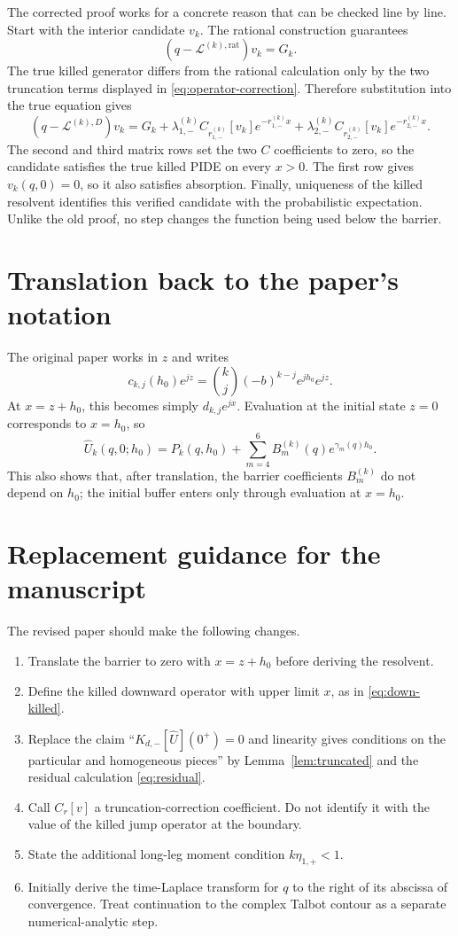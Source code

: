\documentclass[11pt]{article}
\newcommand{\cL}{\mathcal{L}}
\theoremstyle{plain}
\theoremstyle{remark}
\begin{document}
The corrected proof works for a concrete reason that can be checked line by
line.  Start with the interior candidate $v_k$.  The rational construction
guarantees
\[
(q-\cL^{(k),\mathrm{rat}})v_k=G_k.
\]
The true killed generator differs from the rational calculation only by the
two truncation terms displayed in \eqref{eq:operator-correction}.  Therefore
substitution into the true equation gives
\[
(q-\cL^{(k),D})v_k
=G_k
+\lambda_{1,-}^{(k)}C_{r_{1,-}^{(k)}}[v_k]e^{-r_{1,-}^{(k)}x}
+\lambda_{2,-}^{(k)}C_{r_{2,-}^{(k)}}[v_k]e^{-r_{2,-}^{(k)}x}.
\]
The second and third matrix rows set the two $C$ coefficients to zero, so the
candidate satisfies the true killed PIDE on every $x>0$.  The first row gives
$v_k(q,0)=0$, so it also satisfies absorption.  Finally, uniqueness of the
killed resolvent identifies this verified candidate with the probabilistic
expectation.  Unlike the old proof, no step changes the function being used
below the barrier.

\section{Translation back to the paper's notation}

The original paper works in $z$ and writes
\[
c_{k,j}(h_0)e^{jz}
=\binom{k}{j}(-b)^{k-j}e^{jh_0}e^{jz}.
\]
At $x=z+h_0$, this becomes simply $d_{k,j}e^{jx}$.  Evaluation at the initial
state $z=0$ corresponds to $x=h_0$, so
\begin{equation}\label{eq:evaluate-initial}
\widehat U_k(q,0;h_0)
=P_k(q,h_0)+\sum_{m=4}^6B_m^{(k)}(q)e^{\gamma_m(q)h_0}.
\end{equation}
This also shows that, after translation, the barrier coefficients $B_m^{(k)}$
do not depend on $h_0$; the initial buffer enters only through evaluation at
$x=h_0$.

\section{Replacement guidance for the manuscript}

The revised paper should make the following changes.
\begin{enumerate}
\item Translate the barrier to zero with $x=z+h_0$ before deriving the
resolvent.
\item Define the killed downward operator with upper limit $x$, as in
\eqref{eq:down-killed}.
\item Replace the claim
``$K_{d,-}[\widehat U](0^+)=0$ and linearity gives conditions on the
particular and homogeneous pieces'' by Lemma~\ref{lem:truncated} and the
residual calculation \eqref{eq:residual}.
\item Call $C_r[v]$ a truncation-correction coefficient.  Do not identify it
with the value of the killed jump operator at the boundary.
\item State the additional long-leg moment condition $k\eta_{1,+}<1$.
\item Initially derive the time-Laplace transform for $q$ to the right of its
abscissa of convergence.  Treat continuation to the complex Talbot contour as
a separate numerical-analytic step.
\end{enumerate}
\end{document}
